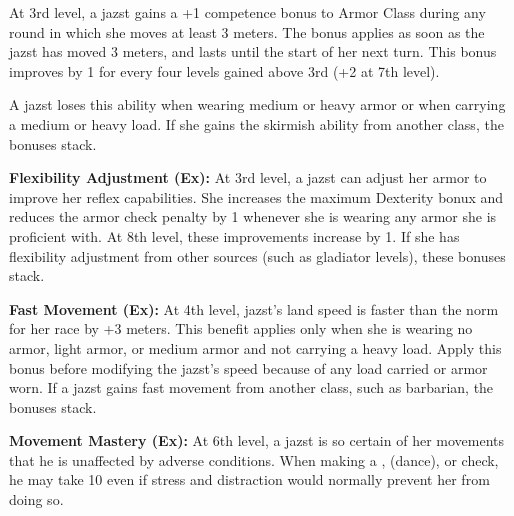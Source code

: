 {At 3rd level, a jazst gains a +1 competence bonus to Armor Class during any round in which she moves at least 3 meters. The bonus applies as soon as the jazst has moved 3 meters, and lasts until the start of her next turn. This bonus improves by 1 for every four levels gained above 3rd (+2 at 7th level).

A jazst loses this ability when wearing medium or heavy armor or when carrying a medium or heavy load. If she gains the skirmish ability from another class, the bonuses stack.

\textbf{Flexibility Adjustment (Ex):} At 3rd level, a jazst can adjust her armor to improve her reflex capabilities. She increases the maximum Dexterity bonux and reduces the armor check penalty by 1 whenever she is wearing any armor she is proficient with. At 8th level, these improvements increase by 1. If she has flexibility adjustment from other sources (such as gladiator levels), these bonuses stack.

\textbf{Fast Movement (Ex):} At 4th level, jazst's land speed is faster than the norm for her race by +3 meters. This benefit applies only when she is wearing no armor, light armor, or medium armor and not carrying a heavy load. Apply this bonus before modifying the jazst's speed because of any load carried or armor worn. If a jazst gains fast movement from another class, such as barbarian, the bonuses stack.

\textbf{Movement Mastery (Ex):} At 6th level, a jazst is so certain of her movements that he is unaffected by adverse conditions. When making a ,  (dance), or  check, he may take 10 even if stress and distraction would normally prevent her from doing so.

}
